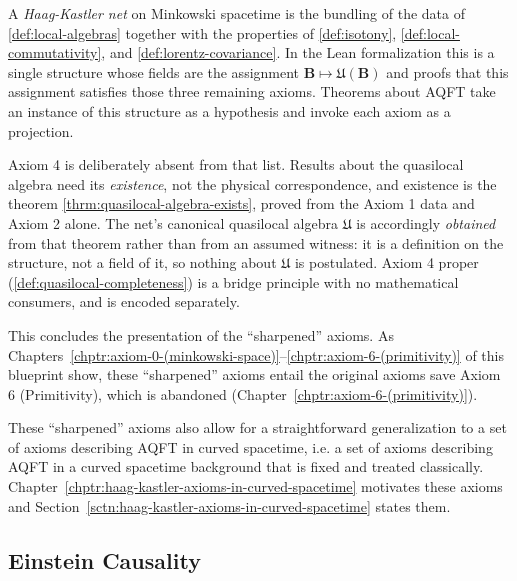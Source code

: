 \begin{definition}
    \label{def:haag-kastler-net}
    \leanok
    A \emph{Haag-Kastler net} on Minkowski spacetime is the bundling of the data of \ref{def:local-algebras} together with the properties of \ref{def:isotony}, \ref{def:local-commutativity}, and \ref{def:lorentz-covariance}. In the Lean formalization this is a single structure whose fields are the assignment $\mathbf{B} \mapsto \mathfrak{U}(\mathbf{B})$ and proofs that this assignment satisfies those three remaining axioms. Theorems about AQFT take an instance of this structure as a hypothesis and invoke each axiom as a projection.

    Axiom 4 is deliberately absent from that list. Results about the quasilocal algebra need its \emph{existence}, not the physical correspondence, and existence is the theorem \ref{thrm:quasilocal-algebra-exists}, proved from the Axiom 1 data and Axiom 2 alone. The net's canonical quasilocal algebra $\mathfrak{U}$ is accordingly \emph{obtained} from that theorem rather than from an assumed witness: it is a definition on the structure, not a field of it, so nothing about $\mathfrak{U}$ is postulated. Axiom 4 proper (\ref{def:quasilocal-completeness}) is a bridge principle with no mathematical consumers, and is encoded separately.
\end{definition}

This concludes the presentation of the ``sharpened'' axioms. As Chapters~\ref{chptr:axiom-0-(minkowski-space)}--\ref{chptr:axiom-6-(primitivity)} of this blueprint show, these ``sharpened'' axioms entail the original axioms save Axiom 6 (Primitivity), which is abandoned (Chapter~\ref{chptr:axiom-6-(primitivity)}).

These ``sharpened'' axioms also allow for a straightforward generalization to a set of axioms describing AQFT in curved spacetime, i.e. a set of axioms describing AQFT in a curved spacetime background that is fixed and treated classically. Chapter~\ref{chptr:haag-kastler-axioms-in-curved-spacetime} motivates these axioms and Section~\ref{sctn:haag-kastler-axioms-in-curved-spacetime} states them.

\subsection{Einstein Causality}

